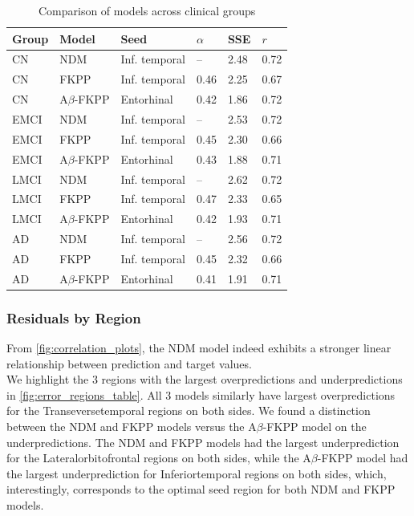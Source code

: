 \begin{table}[h]
    \centering
    \small
    \setlength{\tabcolsep}{4pt}
    \begin{tabular}{llllll}
    \toprule
    \textbf{Group} & \textbf{Model} & \textbf{Seed} & \(\alpha\) & \textbf{SSE} & \textbf{\(r\)} \\
    \midrule
    \rowcolor{gray!15}
    CN   & NDM          & Inf. temporal & --     & 2.48 & 0.72 \\
    \rowcolor{gray!15}
    CN   & FKPP         & Inf. temporal & 0.46  & 2.25 & 0.67 \\
    \rowcolor{gray!15}
    CN   & A$\beta$-FKPP & Entorhinal   & 0.42  & 1.86 & 0.72 \\
    \midrule
    EMCI & NDM          & Inf. temporal & --     & 2.53 & 0.72 \\
    EMCI & FKPP         & Inf. temporal & 0.45  & 2.30 & 0.66 \\
    EMCI & A$\beta$-FKPP & Entorhinal   & 0.43  & 1.88 & 0.71 \\
    \midrule
    \rowcolor{gray!15}
    LMCI & NDM          & Inf. temporal & --     & 2.62 & 0.72 \\
    \rowcolor{gray!15}
    LMCI & FKPP         & Inf. temporal & 0.47  & 2.33 & 0.65 \\
    \rowcolor{gray!15}
    LMCI & A$\beta$-FKPP & Entorhinal   & 0.42  & 1.93 & 0.71 \\
    \midrule
    AD   & NDM          & Inf. temporal & --     & 2.56 & 0.72 \\
    AD   & FKPP         & Inf. temporal & 0.45  & 2.32 & 0.66 \\
    AD   & A$\beta$-FKPP & Entorhinal   & 0.41  & 1.91 & 0.71 \\
    \bottomrule
    \end{tabular}
    \caption{Comparison of models across clinical groups}
    \label{tab:model_comparison_r_sse}
\end{table}


\subsubsection{Residuals by Region}\label{section:residuals_by_region}
From \autoref{fig:correlation_plots}, the NDM model indeed exhibits a stronger linear relationship between prediction and target values.\\ 

We highlight the 3 regions with the largest overpredictions and underpredictions in \autoref{fig:error_regions_table}. All 3 models similarly have largest overpredictions for the Transeversetemporal regions on both sides. We found a distinction between the NDM and FKPP models versus the A$\beta$-FKPP model on the underpredictions. The NDM and FKPP models had the largest underprediction for the Lateralorbitofrontal regions on both sides, while the A$\beta$-FKPP model had the largest underprediction for Inferiortemporal regions on both sides, which, interestingly, corresponds to the optimal seed region for both NDM and FKPP models.\\



